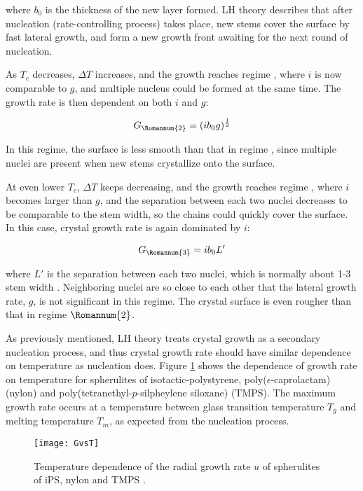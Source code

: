 \noindent
where $b_{0}$ is the thickness of the new layer formed. LH theory describes that after nucleation (rate-controlling process) takes place, new stems cover the surface by fast lateral growth, and form a new growth front awaiting for the next round of nucleation.

As $T_{c}$ decreases, $\Delta T$ increases, and the growth reaches regime , where $i$ is now comparable to $g$, and multiple nucleus could be formed at the same time. The growth rate is then dependent on both $i$ and $g$:

\begin{equation}
\label{eqn_regime2}
G_{\Romannum{2}} = (i b_{0} g)^{\frac{1}{2}}
\end{equation}

In this regime, the surface is less smooth than that in regime , since multiple nuclei are present when new stems crystallize onto the surface.

At even lower $T_{c}$, $\Delta T$ keeps decreasing, and the growth reaches regime , where $i$ becomes larger than $g$, and the separation between each two nuclei decreases to be comparable to the stem width, so the chains could quickly cover the surface. In this case, crystal growth rate is again dominated by $i$:

\begin{equation}
\label{eqn_regime3}
G_{\Romannum{3}} = i b_{0} L'
\end{equation}

\noindent
where $L'$ is the separation between each two nuclei, which is normally about 1-3 stem width \cite{Hoffman1983}. Neighboring nuclei are so close to each other that the lateral growth rate, $g$, is not significant in this regime. The crystal surface is even rougher than that in regime $\Romannum{2}$.

As previously mentioned, LH theory treats crystal growth as a secondary nucleation process, and thus crystal growth rate should have similar dependence on temperature as nucleation does. Figure \ref{fig:growth rate vs T} shows the dependence of growth rate on temperature for spherulites of isotactic-polystyrene, poly($\epsilon$-caprolactam) (nylon) and poly(tetranethyl-$p$-silpheylene siloxane) (TMPS). The maximum growth rate occurs at a temperature between glass transition temperature $T_{g}$ and melting temperature $T_{m}$, as expected from the nucleation process.

\begin{figure}[H]
\center
\texttt{[image: GvsT]}
\caption[Temperature dependence of the radial growth rate $u$ of spherulites of iPS, nylon and TMPS.]{Temperature dependence of the radial growth rate $u$ of spherulites of iPS, nylon and TMPS \cite{Ross1980}.}
\label{fig:growth rate vs T}
\end{figure}


